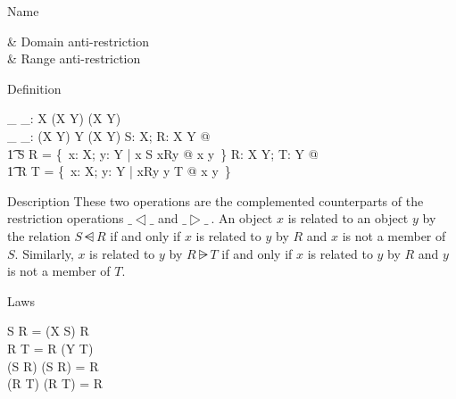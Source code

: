\begin{manpage}\label{p:1050}
\item[Name]
\begin{name}
       \ndres & Domain anti-restriction%
		\symdex{$\ndres$} \\
       \nrres & Range anti-restriction%
		\symdex{$\nrres$}%
\end{name}

\item[Definition]
\begin{gendef}[X,Y]
        \_ \ndres \_: \power X \cross (X \rel Y) \fun (X \rel Y) \\
        \_ \nrres \_: (X \rel Y) \cross \power Y \fun (X \rel Y)
\where
        \forall S: \power X; R: X \rel Y @ \\
\t1         S \ndres R = \{~x: X; y: Y |
		x \notin S \land \reln xRy @ x \mapsto y~\}
\also
        \forall R: X \rel Y; T: \power Y @ \\
\t1         R \nrres T = \{~x: X; y: Y |
		\reln xRy \land y \notin T @ x \mapsto y~\}
\end{gendef}

\item[Description]
These two operations are the complemented counterparts of the restriction
operations $\_ \dres \_$ and $\_ \rres \_~$. An object $x$
is related to an object $y$ by the relation $S \ndres R$ if and only
if $x$ is related to $y$ by $R$ and $x$ is not a member of $S$.
Similarly, $x$ is related to $y$ by $R \nrres T$ if and only if $x$
is related to $y$ by $R$ and $y$ is not a member of $T$.

\item[Laws]
\begin{laws}
        S \ndres R = (X \setminus S) \dres R \\
        R \nrres T = R \rres (Y \setminus T) \\
\also
        (S \dres R) \cup (S \ndres R) = R \\
        (R \rres T) \cup (R \nrres T) = R
\end{laws}
\end{manpage}
